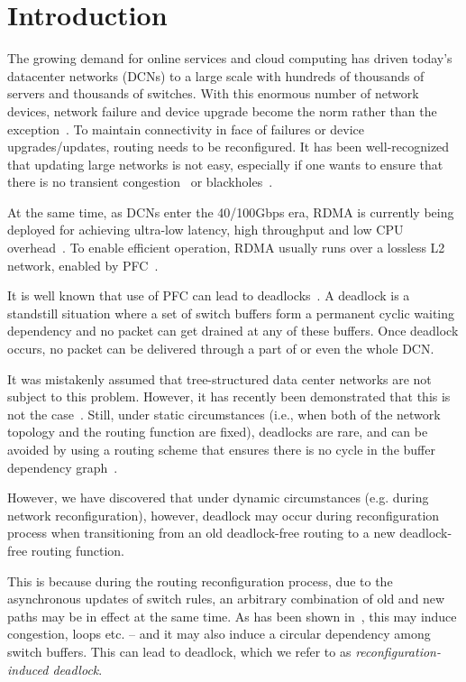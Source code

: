 \section{Introduction}\label{sec:intro}

The growing demand for online services and cloud computing has driven today's
datacenter networks (DCNs) to a large scale with hundreds of thousands of
servers and thousands of switches. With this enormous number of network devices,
network failure and device upgrade become the norm rather than the
exception~\cite{zupdate, netpilot}. To maintain connectivity in face of
failures or device upgrades/updates, routing needs to be reconfigured. It has been
well-recognized that updating large networks is not easy, especially if one
wants to ensure that there is no transient congestion~\cite{zupdate} or
blackholes~\cite{dionysus}.

At the same time, as DCNs enter the 40/100Gbps era, RDMA is currently being
deployed for achieving ultra-low latency, high throughput and low CPU
overhead~\cite{dcqcn,timely,rdmaatscale}.  To enable efficient operation,
RDMA usually runs over a  lossless L2 network, enabled by PFC~\cite{dcqcn}.

It is well known that use of PFC can lead to deadlocks~\cite{tcp-bolt}.  A
deadlock is a standstill situation where a set of switch buffers form a
permanent cyclic waiting dependency and no packet can get drained at any of
these buffers. Once deadlock occurs, no packet can be delivered through a part
of or even the whole DCN.

It was mistakenly assumed that tree-structured data center networks are not
subject to this problem. However, it has recently been demonstrated that this is
not the case~\cite{rdmaatscale}. Still, under static circumstances (i.e.,
when both of the network topology and the routing function are fixed), deadlocks
are rare, and can be avoided by using a routing scheme that ensures there is no
cycle in the buffer dependency graph~\cite{tcp-bolt}.

However, we have discovered that under dynamic circumstances (e.g. during
network reconfiguration), however, deadlock may occur during reconfiguration
process when transitioning from an old deadlock-free routing to a new
deadlock-free routing function. 

This is because during the routing reconfiguration process, due to the
asynchronous updates of switch rules, an arbitrary combination of old and new
paths may be in effect at the same time.  As has been shown
in~\cite{zupdate,dionysus}, this may induce congestion, loops etc. -- and it
may also induce a circular dependency among switch buffers. This can lead to
deadlock, which we refer to as \textit{reconfiguration-induced deadlock}.

